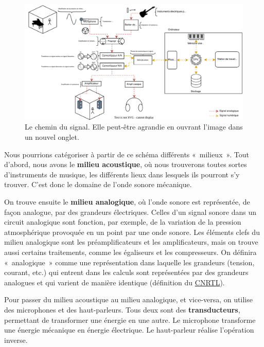 \documentclass[
]{book}
\begin{document}
\begin{figure}

{\centering \includegraphics[width=1\linewidth]{_resources/diagrams/cheminSignal} 

}

\caption{Le chemin du signal. Elle peut-être agrandie en ouvrant l'image dans un nouvel onglet.}\label{fig:unnamed-chunk-15}
\end{figure}

Nous pourrions catégoriser à partir de ce schéma différents «~milieux~». Tout d'abord, nous avons le \textbf{milieu acoustique}, où nous trouverons toutes sortes d'instruments de musique, les différents lieux dans lesquels ils pourront s'y trouver. C'est donc le domaine de l'onde sonore mécanique.

On trouve ensuite le \textbf{milieu analogique}, où l'onde sonore est représentée, de façon analogue, par des grandeurs électriques. Celles d'un signal sonore dans un circuit analogique sont fonction, par exemple, de la variation de la pression atmosphérique provoquée en un point par une onde sonore. Les éléments clefs du milieu analogique sont les préamplificateurs et les amplificateurs, mais on trouve aussi certains traitements, comme les égaliseurs et les compresseurs. On définira «~analogique~» comme une représentation dans laquelle les grandeurs (tension, courant, etc.) qui entrent dans les calculs sont représentées par des grandeurs analogues et qui varient de manière identique (définition du \href{https://www.cnrtl.fr/definition/analogique}{CNRTL}).

Pour passer du milieu acoustique au milieu analogique, et vice-versa, on utilise des microphones et des haut-parleurs. Tous deux sont des \textbf{transducteurs}, permettant de transformer une énergie en une autre. Le microphone transforme une énergie mécanique en énergie électrique. Le haut-parleur réalise l'opération inverse.
\end{document}
